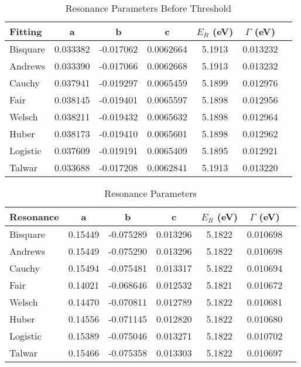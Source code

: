 \documentclass[Dissertation.tex]{subfiles}
\begin{document}
\setlength{\abovecaptionskip}{6pt}
\setlength{\belowcaptionskip}{6pt}
\begin{table}[H]
\centering
\begin{tabular}{l c c c c c c}
\toprule
Fitting & a & b & c & $E_R$ (eV) & $\Gamma$ (eV) \\
\midrule
Bisquare	& 0.033382 & -0.017062 & 0.0062664 & 5.1913 & 0.013232 \\
Andrews		& 0.033390 & -0.017066 & 0.0062668 & 5.1913 & 0.013232 \\
Cauchy		& 0.037941 & -0.019297 & 0.0065459 & 5.1899 & 0.012976 \\
Fair			& 0.038145 & -0.019401 & 0.0065597 & 5.1898 & 0.012956 \\
Welsch		& 0.038211 & -0.019432 & 0.0065632 & 5.1898 & 0.012964 \\
Huber			& 0.038173 & -0.019410 & 0.0065601 & 5.1898 & 0.012962 \\
Logistic	& 0.037609 & -0.019191 & 0.0065409 & 5.1895 & 0.012921 \\
Talwar		& 0.033688 & -0.017208 & 0.0062841 & 5.1913 & 0.013220 \\
\bottomrule
\end{tabular}
\caption{Resonance Parameters Before Threshold}
\label{tab:FWaveResonanceBefore}
\end{table}


\setlength{\abovecaptionskip}{6pt}
\setlength{\belowcaptionskip}{6pt}
\begin{table}[H]
\centering
\begin{tabular}{l c c c c c c}
\toprule
Resonance & a & b & c & $E_R$ (eV) & $\Gamma$ (eV) \\
\midrule
Bisquare	& 0.15449 & -0.075289 & 0.013296 & 5.1822 & 0.010698 \\
Andrews		& 0.15449 & -0.075290 & 0.013296 & 5.1822 & 0.010698 \\
Cauchy		& 0.15494 & -0.075481 & 0.013317 & 5.1822 & 0.010694 \\
Fair			& 0.14021 & -0.068646 & 0.012532 & 5.1821 & 0.010672 \\ 
Welsch		& 0.14470 & -0.070811 & 0.012789 & 5.1822 & 0.010681 \\
Huber			& 0.14556 & -0.071145 & 0.012820 & 5.1822 & 0.010680 \\
Logistic	& 0.15389 & -0.075046 & 0.013271 & 5.1822 & 0.010702 \\ 
Talwar		& 0.15466 & -0.075358 & 0.013303 & 5.1822 & 0.010697 \\
\bottomrule
\end{tabular}
\caption{Resonance Parameters}
\label{tab:FWaveResonanceFull}
\end{table}
\end{document}
